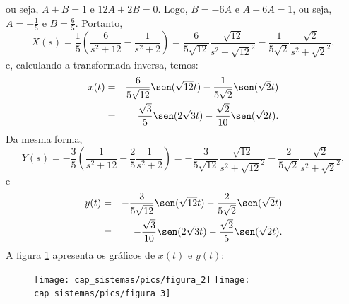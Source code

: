 ou seja, $A+B=1$ e $12A+2B=0$. Logo, $B=-6A$ e $A-6A=1$, ou seja, $A=-\frac{1}{5}$ e $B=\frac{6}{5}$. Portanto,
\begin{equation}
X(s)=\frac{1}{5}\left(\frac{6}{s^2+12}-\frac{1}{s^2+2}\right)=\frac{6}{5\sqrt{12}}\frac{\sqrt{12}}{s^2+\sqrt{12}^2}-\frac{1}{5\sqrt{2}}\frac{\sqrt{2}}{s^2+\sqrt{2}^2},
\end{equation}
e, calculando a transformada inversa, temos:
\begin{eqnarray*}
x(t)&=&\frac{6}{5\sqrt{12}}\sen(\sqrt{12}t)-\frac{1}{5\sqrt{2}}\sen(\sqrt{2}t)\\
&=&\frac{\sqrt{3}}{5}\sen(2\sqrt{3}t)-\frac{\sqrt{2}}{10}\sen(\sqrt{2}t).
\end{eqnarray*}
Da mesma forma,
\begin{equation}
Y(s)=-\frac{3}{5}\left(\frac{1}{s^2+12}-\frac{2}{5}\frac{1}{s^2+2}\right)=-\frac{3}{5\sqrt{12}}\frac{\sqrt{12}}{s^2+\sqrt{12}^2}-\frac{2}{5\sqrt{2}}\frac{\sqrt{2}}{s^2+\sqrt{2}^2},
\end{equation}
e
\begin{eqnarray*}
y(t)&=&-\frac{3}{5\sqrt{12}}\sen(\sqrt{12}t)-\frac{2}{5\sqrt{2}}\sen(\sqrt{2}t)\\
&=&-\frac{\sqrt{3}}{10}\sen(2\sqrt{3}t)-\frac{\sqrt{2}}{5}\sen(\sqrt{2}t).
\end{eqnarray*}
A figura \ref{fig_massa_mola_2_malha} apresenta os gráficos de $x(t)$ e $y(t)$:
 \begin{figure}[!ht]
\begin{center}

\texttt{[image: cap\_sistemas/pics/figura\_2]}
\texttt{[image: cap\_sistemas/pics/figura\_3]}\end{center}
\caption{\label{fig_massa_mola_2_malha}}
\end{figure}


